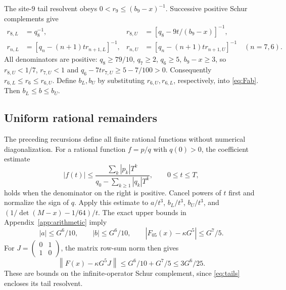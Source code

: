 \documentclass[11pt]{article}
\newcommand{\norm}[1]{\left\|#1\right\|}
\newcommand{\abs}[1]{\left|#1\right|}
\begin{document}
The site-$9$ tail resolvent obeys $0<r_9\leq(b_9-x)^{-1}$. Successive positive Schur complements give
\begin{align}
r_{8,L}&=q_8^{-1},&
r_{8,U}&=[q_8-9t/(b_9-x)]^{-1},\nonumber\\
r_{n,L}&=[q_n-(n+1)tr_{n+1,L}]^{-1},&
r_{n,U}&=[q_n-(n+1)tr_{n+1,U}]^{-1}
\quad(n=7,6).\label{eq:tails}
\end{align}
All denominators are positive: $q_8\geq79/10$, $q_7\geq2$,
$q_6\geq5$, $b_9-x\geq3$, so $r_{8,U}<1/7$, $r_{7,U}<1$ and
$q_6-7tr_{7,U}\geq5-7/100>0$.
Consequently $r_{6,L}\leq r_6\leq r_{6,U}$.
Define $b_L,b_U$ by substituting $r_{6,U},r_{6,L}$, respectively, into \eqref{eq:Fab}. Then $b_L\leq b\leq b_U$.

\subsection{Uniform rational remainders}
The preceding recursions define all finite rational functions without numerical diagonalization. For a rational function $f=p/q$ with $q(0)>0$, the coefficient estimate
\begin{equation}\label{eq:rational}
\abs{f(t)}\leq
\frac{\sum_k|p_k|T^k}{q_0-\sum_{k\geq1}|q_k|T^k},
\qquad 0\leq t\leq T,
\end{equation}
holds when the denominator on the right is positive. Cancel powers of $t$ first and normalize the sign of $q$.
Apply this estimate to $a/t^3$, $b_L/t^3$, $b_U/t^3$, and
$(1/\det(M-x)-1/64)/t$. The exact upper bounds in Appendix~\ref{app:arithmetic} imply
\begin{equation}\label{eq:Ferr}
|a|\leq G^6/10,\qquad |b|\leq G^6/10,\qquad
|F_{05}(x)-\kappa G^5|\leq G^7/5 .
\end{equation}
For $J=\begin{pmatrix}0&1\\1&0\end{pmatrix}$, the matrix row-sum norm then gives
\begin{equation}\label{eq:normF}
\norm{F(x)-\kappa G^5J}
\leq G^6/10+G^7/5\leq3G^6/25 .
\end{equation}
These are bounds on the infinite-operator Schur complement, since \eqref{eq:tails} encloses its tail resolvent.
\end{document}
